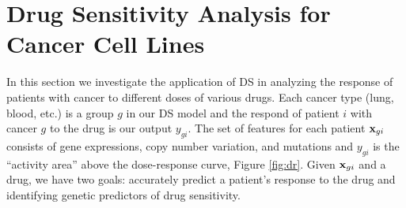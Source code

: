 \section{Drug Sensitivity Analysis for Cancer Cell Lines}
\label{realexp}
In this section we investigate the application of DS in analyzing the response of patients with cancer to different doses of various drugs. 
Each cancer type (lung, blood, etc.) is a group $g$ in our DS model and the respond of patient $i$ with cancer $g$ to the drug is our output $y_{gi}$. 
The set of features for each patient $\mathbf{x}_{gi}$ consists of gene expressions, copy number variation, and mutations and $y_{gi}$ is the ``activity area'' above the dose-response curve, Figure \ref{fig:dr}.
Given $\mathbf{x}_{gi}$ and a drug, we have two goals: accurately predict a patient's response to the drug and identifying genetic predictors of drug sensitivity. 
%

